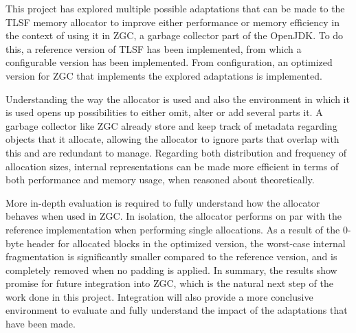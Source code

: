 
This project has explored multiple possible adaptations that can be made to the TLSF memory allocator to improve either performance or memory efficiency in the context of using it in ZGC, a garbage collector part of the OpenJDK. To do this, a reference version of TLSF has been implemented, from which a configurable version has been implemented. From configuration, an optimized version for ZGC that implements the explored adaptations is implemented.

Understanding the way the allocator is used and also the environment in which it is used opens up possibilities to either omit, alter or add several parts it. A garbage collector like ZGC already store and keep track of metadata regarding objects that it allocate, allowing the allocator to ignore parts that overlap with this and are redundant to manage. Regarding both distribution and frequency of allocation sizes, internal representations can be made more efficient in terms of both performance and memory usage, when reasoned about theoretically.

More in-depth evaluation is required to fully understand how the allocator behaves when used in ZGC. In isolation, the allocator performs on par with the reference implementation when performing single allocations. As a result of the 0-byte header for allocated blocks in the optimized version, the worst-case internal fragmentation is significantly smaller compared to the reference version, and is completely removed when no padding is applied. In summary, the results show promise for future integration into ZGC, which is the natural next step of the work done in this project. Integration will also provide a more conclusive environment to evaluate and fully understand the impact of the adaptations that have been made.

